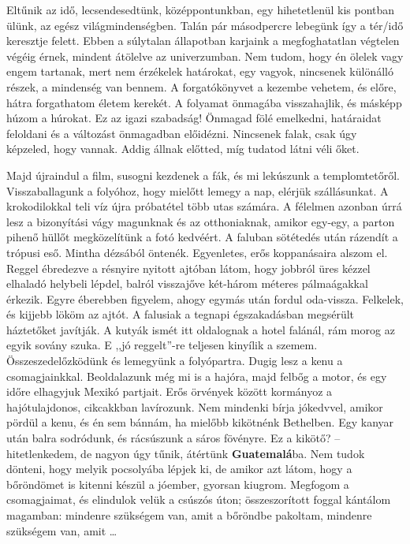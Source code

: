 \bigskip
\begin{itshape}
Eltűnik az idő, lecsendesedtünk, középpontunkban, egy hihetetlenül kis
pontban ülünk, az egész világmindenségben. Talán pár másodpercre lebegünk
így a tér/idő keresztje felett. Ebben a súlytalan állapotban karjaink a
megfoghatatlan végtelen végéig érnek, mindent átölelve az univerzumban.
Nem tudom, hogy én ölelek vagy engem tartanak, mert nem érzékelek határokat,
egy vagyok, nincsenek különálló részek, a mindenség van bennem.
A forgatókönyvet a kezembe vehetem, és előre, hátra forgathatom életem
kerekét. A folyamat önmagába visszahajlik, és másképp húzom a húrokat.
Ez az igazi szabadság! Önmagad fölé emelkedni, határaidat feloldani és a
változást önmagadban előidézni. Nincsenek falak, csak úgy képzeled, hogy
vannak. Addig állnak előtted, míg tudatod látni véli őket.
\end{itshape}
\bigskip

Majd újraindul a film, susogni kezdenek a fák, és mi lekúszunk a
templomtetőről. Visszaballagunk a folyóhoz, hogy mielőtt lemegy
a nap, elérjük szállásunkat. A krokodilokkal teli víz újra próbatétel
több utas számára. A félelmen azonban úrrá lesz a bizonyítási vágy
magunknak és az otthoniaknak, amikor egy-egy, a parton pihenő hüllőt
megközelítünk a fotó kedvéért. A faluban sötétedés után rázendít
a trópusi eső. Mintha dézsából öntenék. Egyenletes, erős koppanásaira
alszom el. Reggel ébredezve a résnyire nyitott ajtóban látom, hogy
jobbról üres kézzel elhaladó helybeli lépdel, balról visszajőve két-három
méteres pálmaágakkal érkezik. Egyre éberebben figyelem, ahogy egymás
után fordul oda-vissza. Felkelek, és kijjebb lököm az ajtót. A falusiak
a tegnapi égszakadásban megsérült háztetőket javítják. A kutyák
ismét itt oldalognak a hotel falánál, rám morog az egyik sovány szuka.
E ,,jó reggelt''-re teljesen kinyílik a szemem. Összeszedelőzködünk és
lemegyünk a folyópartra. Dugig lesz a kenu a csomagjainkkal. Beoldalazunk
még mi is a hajóra, majd felbőg a motor, és egy időre elhagyjuk
Mexikó partjait. Erős örvények között kormányoz a hajótulajdonos,
cikcakkban lavírozunk. Nem mindenki bírja jókedvvel, amikor pördül
a kenu, és én sem bánnám, ha mielőbb kikötnénk Bethelben. Egy
kanyar után balra sodródunk, és rácsúszunk a sáros fövényre. Ez a
kikötő? -- hitetlenkedem, de nagyon úgy tűnik, átértünk \textbf{Guatemalá}ba.
Nem tudok dönteni, hogy melyik pocsolyába lépjek ki, de amikor azt
látom, hogy a bőröndömet is kitenni készül a jóember, gyorsan kiugrom.
Megfogom a csomagjaimat, és elindulok velük a csúszós úton;
összeszorított foggal kántálom magamban: mindenre szükségem van,
amit a bőröndbe pakoltam, mindenre szükségem van, amit \dots

